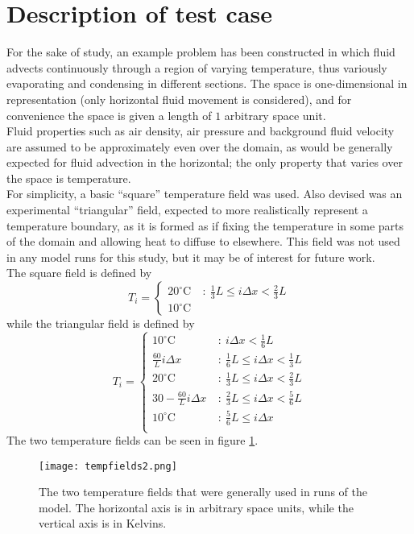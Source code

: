 \documentclass[11pt]{article}
\begin{document}
\section{Description of test case}
For the sake of study, an example problem has been constructed in which fluid advects continuously through a region of varying temperature, thus variously evaporating and condensing in different sections. The space is one-dimensional in representation (only horizontal fluid movement is considered), and for convenience the space is given a length of $1$ arbitrary space unit. \\
Fluid properties such as air density, air pressure and background fluid velocity are assumed to be approximately even over the domain, as would be generally expected for fluid advection in the horizontal; the only property that varies over the space is temperature. \\
For simplicity, a basic ``square'' temperature field was used. Also devised was an experimental ``triangular'' field, expected to more realistically represent a temperature boundary, as it is formed as if fixing the temperature in some parts of the domain and allowing heat to diffuse to elsewhere. This field was not used in any model runs for this study, but it may be of interest for future work. \\
The square field is defined by
\[
T_i = \begin{cases}
20^{\circ}\text{C} & ~:~ \frac{1}{3}L \leq i\Delta x < \frac{2}{3}L \\
10^{\circ}\text{C} & ~
\end{cases}
\]
while the triangular field is defined by
\[
T_i = \begin{cases}
10^{\circ}\text{C} & ~:~ i\Delta x < \frac{1}{6}L \\
\frac{60}{L}i\Delta x & ~:~ \frac{1}{6}L \leq i\Delta x < \frac{1}{3}L \\
20^{\circ}\text{C} & ~:~ \frac{1}{3}L \leq i\Delta x < \frac{2}{3}L \\
30-\frac{60}{L}i\Delta x & ~:~ \frac{2}{3}L \leq i\Delta x < \frac{5}{6}L \\
10^{\circ}\text{C} & ~:~ \frac{5}{6}L \leq i\Delta x \\
\end{cases}
\]
The two temperature fields can be seen in figure \ref{fig:tempfields}.
\begin{figure}[H]
\centering
\texttt{[image: tempfields2.png]}
\caption{The two temperature fields that were generally used in runs of the model. The horizontal axis is in arbitrary space units, while the vertical axis is in Kelvins.}
\label{fig:tempfields}
\end{figure}
\end{document}
